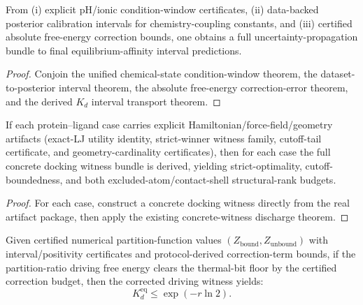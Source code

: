 \begin{theorem}\label{thm:chemistry-data-backed-kd-interval-bundle}
From (i) explicit pH/ionic condition-window certificates, (ii) data-backed posterior calibration intervals for chemistry-coupling constants, and (iii) certified absolute free-energy correction bounds, one obtains a full uncertainty-propagation bundle to final equilibrium-affinity interval predictions.
\end{theorem}

\begin{proof}
Conjoin the unified chemical-state condition-window theorem, the dataset-to-posterior interval theorem, the absolute free-energy correction-error theorem, and the derived $K_d$ interval transport theorem.
\end{proof}

\begin{theorem}\label{thm:md-per-case-real-artifact-discharge-all-targets}
If each protein--ligand case carries explicit Hamiltonian/force-field/geometry artifacts (exact-LJ utility identity, strict-winner witness family, cutoff-tail certificate, and geometry-cardinality certificates), then for each case the full concrete docking witness bundle is derived, yielding strict-optimality, cutoff-boundedness, and both excluded-atom/contact-shell structural-rank budgets.
\end{theorem}

\begin{proof}
For each case, construct a concrete docking witness directly from the real artifact package, then apply the existing concrete-witness discharge theorem.
\end{proof}

\begin{theorem}\label{thm:partition-correction-numerical-kd-upper-bound-bundle}
Given certified numerical partition-function values $(Z_{\mathrm{bound}}, Z_{\mathrm{unbound}})$ with interval/positivity certificates and protocol-derived correction-term bounds, if the partition-ratio driving free energy clears the thermal-bit floor by the certified correction budget, then the corrected driving witness yields:
\[
K_d^{\mathrm{eq}} \le \exp(-r\ln 2).
\]
\end{theorem}

